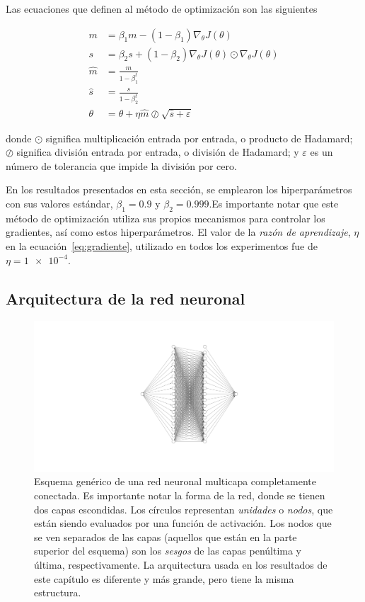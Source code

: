 Las ecuaciones que definen al método de optimización son las siguientes

\begin{align}
    m &= \beta_1 m - (1 - \beta_1) \nabla_{\theta} J(\theta) \nonumber \\
    s &= \beta_2 s + (1 - \beta_2) \nabla_{\theta} J(\theta) \odot \nabla_{\theta} J(\theta) \nonumber \\
    \hat{m} &= \frac{m}{1 - \beta_1^t} \nonumber \\
    \hat{s} &= \frac{s}{1 - \beta_2^t} \nonumber \\
    \theta &= \theta + \eta \hat{m} \oslash \sqrt{\hat{s} + \varepsilon}
    \label{eq:adam}
\end{align}

donde $\odot$ significa multiplicación entrada por entrada, o producto de Hadamard;
$\oslash$ significa división entrada por entrada, o división de Hadamard;
y $\varepsilon$ es un número de tolerancia que impide la división por cero.

En los resultados presentados en esta sección, se emplearon los hiperparámetros con sus
valores estándar, $\beta_1=\num{0.9}$ y $\beta_2=\num{0.999}$.Es importante notar que
este método de optimización utiliza sus propios mecanismos para controlar los gradientes,
así como estos hiperparámetros. El valor de la \emph{razón de aprendizaje}, $\eta$
en la ecuación~\eqref{eq:gradiente}, utilizado en todos los experimentos fue de
$\eta=\num{1e-4}$.

\subsection{Arquitectura de la red neuronal}

\begin{figure}[t]
    \includegraphics[width=\textwidth]{figuras/capitulo-3/neural-network.pdf}
    \vspace{-1.5cm}
    \caption[Esquema genérico de una red neuronal.]{Esquema genérico de una red neuronal multicapa completamente conectada. Es importante notar la forma de la red, donde se tienen dos capas escondidas. Los círculos representan \emph{unidades} o \emph{nodos}, que están siendo evaluados por una función de activación. Los nodos que se ven separados de las capas (aquellos que están en la parte superior del esquema) son los \emph{sesgos} de las capas penúltima y última, respectivamente. La arquitectura usada en los resultados de este capítulo es diferente y más grande, pero tiene la misma estructura.}
    \label{fig:nn-esquema}
\end{figure}

